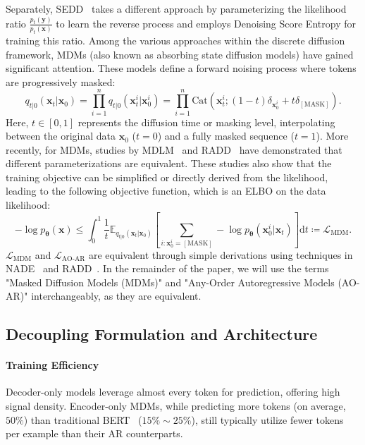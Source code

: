 Separately, SEDD~\cite{lou2023discrete} takes a different approach by parameterizing the likelihood ratio $\frac{p_t(\boldsymbol{y})}{p_t(\boldsymbol{x})}$ to learn the reverse process and employs Denoising Score Entropy for training this ratio. Among the various approaches within the discrete diffusion framework, MDMs (also known as absorbing state diffusion models) have gained significant attention. These models define a forward noising process where tokens are progressively masked:
\begin{equation}
q_{t|0}\left(\boldsymbol{x}_t | \boldsymbol{x}_0\right) = \prod_{i=1}^n q_{t|0}\left(\boldsymbol{x}_t^i | \boldsymbol{x}_0^i\right) = \prod_{i=1}^n \text{Cat}\left(\boldsymbol{x}_t^i;(1-t)\delta_{\boldsymbol{x}_0^i} + t \delta_{[\text{MASK}]}\right).
\end{equation}
Here, $t \in [0, 1]$ represents the diffusion time or masking level, interpolating between the original data $\boldsymbol{x}_0$ ($t=0$) and a fully masked sequence ($t=1$).
More recently, for MDMs, studies by MDLM~\cite{shi2024simplified,sahoo2024simple,zheng2024masked} and RADD~\cite{ou2024your} have demonstrated that different parameterizations are equivalent. These studies also show that the training objective can be simplified or directly derived from the likelihood, leading to the following objective function, which is an ELBO on the data likelihood:
\begin{equation}
-\log p_{\boldsymbol{\theta}}\left(\boldsymbol{x}\right) \leq \int_{0}^1 \frac{1}{t} \mathbb{E}_{q_{t|0}\left(\boldsymbol{x}_t | \boldsymbol{x}_0\right)}\left[ \sum_{i:\boldsymbol{x}_0^i = [\text{MASK}]} -\log p_{\boldsymbol{\theta}}(\boldsymbol{x}_0^i|\boldsymbol{x}_t)\right] \mathrm{d}t \coloneqq \mathcal{L}_{\text{MDM}}.
\end{equation}
$\mathcal{L}_{\text{MDM}}$ and $\mathcal{L}_{\text{AO-AR}}$ are equivalent through simple derivations using techniques in NADE~\cite{uria2016neural} and RADD~\cite{ou2024your}. In the remainder of the paper, we will use the terms "Masked Diffusion Models (MDMs)" and "Any-Order Autoregressive Models (AO-AR)" interchangeably, as they are equivalent.

\subsection{Decoupling Formulation and Architecture} \label{sec:decoupling}

\paragraph{Training Efficiency} Decoder-only models leverage almost every token for prediction, offering high signal density. Encoder-only MDMs, while predicting more tokens (on average, $50\%$) than traditional BERT~\cite{devlin2019bert} ($15\%\sim25\%$), still typically utilize fewer tokens per example than their AR counterparts.

